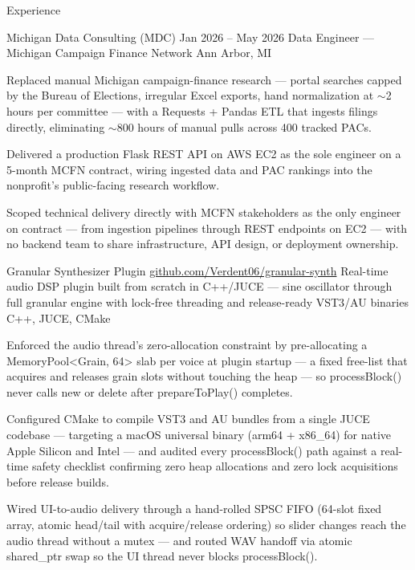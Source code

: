 \documentclass[
	11pt
]{../../../template}
\begin{document}
	\begin{rSection}{E}{xperience}
		\begin{rSectionEntry}
			{Michigan Data Consulting (MDC)}
			{Jan 2026 -- May 2026}
			{Data Engineer --- Michigan Campaign Finance Network}
			{}
			{Ann Arbor, MI}

			\item Replaced manual Michigan campaign-finance research --- portal searches capped by the Bureau of Elections, irregular Excel exports, hand normalization at $\sim$2 hours per committee --- with a Requests + Pandas ETL that ingests filings directly, eliminating $\sim$800 hours of manual pulls across 400 tracked PACs.
			\item Delivered a production Flask REST API on AWS EC2 as the sole engineer on a 5-month MCFN contract, wiring ingested data and PAC rankings into the nonprofit's public-facing research workflow.
			\item Scoped technical delivery directly with MCFN stakeholders as the only engineer on contract --- from ingestion pipelines through REST endpoints on EC2 --- with no backend team to share infrastructure, API design, or deployment ownership.
		\end{rSectionEntry}

		\begin{rSectionEntry}
			{Granular Synthesizer Plugin}
			{\href{https://github.com/Verdent06/granular-synth}{github.com/Verdent06/granular-synth}}
			{Real-time audio DSP plugin built from scratch in C++/JUCE --- sine oscillator through full granular engine with lock-free threading and release-ready VST3/AU binaries}
			{C++, JUCE, CMake}
			{}

			\item Enforced the audio thread's zero-allocation constraint by pre-allocating a MemoryPool<Grain, 64> slab per voice at plugin startup --- a fixed free-list that acquires and releases grain slots without touching the heap --- so processBlock() never calls new or delete after prepareToPlay() completes.
			\item Configured CMake to compile VST3 and AU bundles from a single JUCE codebase --- targeting a macOS universal binary (arm64 + x86\_64) for native Apple Silicon and Intel --- and audited every processBlock() path against a real-time safety checklist confirming zero heap allocations and zero lock acquisitions before release builds.
			\item Wired UI-to-audio delivery through a hand-rolled SPSC FIFO (64-slot fixed array, atomic head/tail with acquire/release ordering) so slider changes reach the audio thread without a mutex --- and routed WAV handoff via atomic shared\_ptr swap so the UI thread never blocks processBlock().
		\end{rSectionEntry}


\end{rSection}
\end{document}
